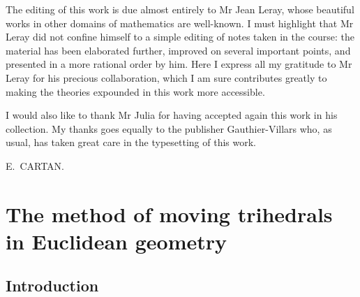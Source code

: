 \documentclass[leqno,11pt]{book}
\numberwithin{equation}{chapter}
\theoremstyle{shape1}
\theoremstyle{shapesmall}
\newcommand{\somespace}{\vspace{9pt}}
\begin{document}
The editing of this work is due almost entirely to Mr Jean Leray, whose beautiful works in other domains of mathematics are well-known. I must highlight that Mr Leray did not confine himself to a simple editing of notes taken in the course: the material has been elaborated further, improved on several important points, and presented in a more rational order by him. Here I express all my gratitude to Mr Leray for his precious collaboration, which I am sure contributes greatly to making the theories expounded in this work more accessible.

I would also like to thank Mr Julia for having accepted again this work in his collection. My thanks goes equally to the publisher Gauthier-Villars who, as usual, has taken great care in the typesetting of this work.

\somespace

\hfill E.~CARTAN.

\tableofcontents

%



\part{The method of moving trihedrals in Euclidean geometry}
\label{part:1}

\chapter*{Introduction}
\label{cha:0}
\end{document}

